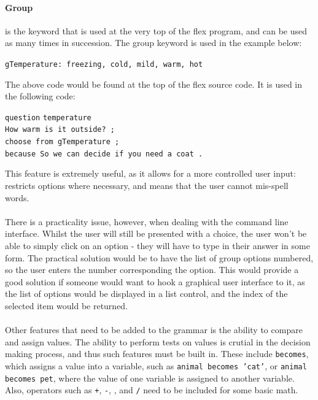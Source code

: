 \documentclass[12pt]{report}
\begin{document}
\paragraph{Group} is the keyword that is used at the very top of the flex program, and can be used as many times in succession.  The group keyword is used in the example below:
\begin{center}
\texttt{gTemperature: freezing, cold, mild, warm, hot}\\
\end{center}
The above code would be found at the top of the flex source code.  It is used in the following code:
\begin{tabbing}
\texttt{question} \= \texttt{temperature}\\
\> \texttt{How warm is it outside? ;}\\
\> \texttt{choose from gTemperature ;}\\
\> \texttt{because So we can decide if you need a coat .}\\
\end{tabbing}
This feature is extremely useful, as it allows for a more controlled user input: restricts options where necessary, and means that the user cannot mis-spell words.\\
\\
There is a practicality issue, however, when dealing with the command line interface.  Whilst the user will still be presented with a choice, the user won't be able to simply click on an option - they will have to type in their answer in some form.  The practical solution would be to have the list of group options numbered, so the user enters the number corresponding the option.  This would provide a good solution if someone would want to hook a graphical user interface to it, as the list of options would be displayed in a list control, and the index of the selected item would be returned.
\\
\\
Other features that need to be added to the grammar is the ability to compare and assign values.  The ability to perform tests on values is crutial in the decision making process, and thus such features must be built in.  These include \texttt{becomes}, which assigns a value into a variable, such as \texttt{animal becomes 'cat'}, or \texttt{animal becomes pet}, where the value of one variable is assigned to another variable.  Also, operators such as \texttt{+}, \texttt{-}, \texttt{\*}, and \texttt{/} need to be included for some basic math.\\
\end{document}
